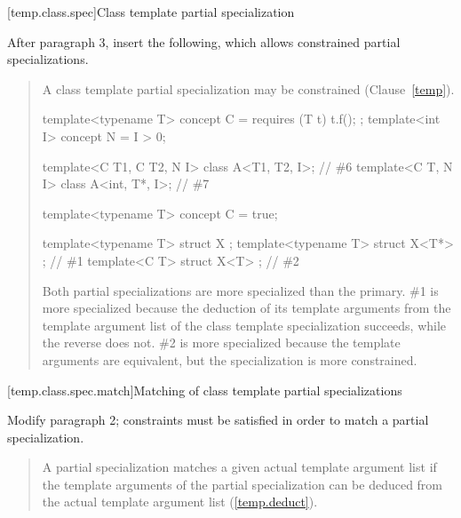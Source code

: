 [temp.class.spec]{Class template partial specialization}

After paragraph 3, insert the following, which allows constrained partial 
specializations.

\begin{quote}
\begin{addedblock}
\setcounter{Paras}{3}
\pnum
A class template partial specialization may be constrained
(Clause~\ref{temp}).
\enterexample
\begin{codeblock}
template<typename T> concept C = requires (T t) { t.f(); };
template<int I> concept N = I > 0;

template<C T1, C T2, N I> class A<T1, T2, I>;  // \#6
template<C T, N I>        class A<int, T*, I>; // \#7
\end{codeblock}
\exitexample

\enterexample
\begin{codeblock}
template<typename T> concept C = true;

template<typename T> struct X { }; 
template<typename T> struct X<T*> { }; // \#1
template<C T> struct X<T> { };         // \#2
\end{codeblock}
Both partial specializations are more specialized than the primary. \#1
is more specialized because the deduction of its template arguments
from the template argument list of the class template specialization succeeds,
while the reverse does not. \#2 is more specialized because
the template arguments are equivalent, but the specialization is more
constrained.
\exitexample
\end{addedblock}
\end{quote}

[temp.class.spec.match]{Matching of class template partial specializations}

Modify paragraph 2; constraints must be satisfied in order
to match a partial specialization. 

\begin{quote}
\setcounter{Paras}{1}
\pnum
A partial specialization matches a given actual template argument list if 
the template arguments of the partial specialization can be deduced from the 
actual template argument list (\ref{temp.deduct}).
\end{quote}

